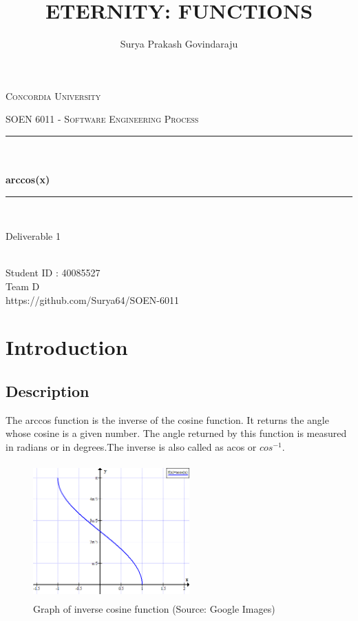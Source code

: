 \documentclass[12pt]{report}
\title{ETERNITY: FUNCTIONS}
\author{Surya Prakash Govindaraju}
\date{}
\makeatletter
\let\thetitle\@title
\let\theauthor\@author
\makeatother
\begin{document}
\begin{titlepage}
	\centering
    \vspace*{0.5 cm}
\begin{center}    \textsc{\Large Concordia University}\\[2.0 cm]	\end{center}
	\textsc{\Large  SOEN 6011 - Software Engineering Process }\\[0.5 cm]
	\rule{\linewidth}{0.2 mm} \\[0.4 cm]
	{ \huge \textbf \thetitle}\\[0.2 cm]
	{ \huge \textbf{arccos(x)}}
	\rule{\linewidth}{0.2 mm} \\[1.5 cm]

\begin{center}   {\Large Deliverable 1}\\[2.0 cm]
\end{center}	
\begin{center}   {\Large \textbf{\theauthor}} \\[0.2 cm]
                 {\large Student ID : 40085527 }\\[0.2 cm]
                 {\large Team D }\\[2.0 cm]	
                 {\large https://github.com/Surya64/SOEN-6011}
\end{center}
	
\end{titlepage}

\tableofcontents
\pagebreak

\renewcommand{\thesection}{\arabic{section}}
\section{Introduction}
\subsection{Description}
The arccos function is the inverse of the cosine function. It returns the angle whose cosine is a given number. The angle returned by this function is measured in radians or in degrees.The inverse is also called as acos or $cos^{-1}$.

\begin{figure}[h!]
\begin{center}
  \includegraphics[width=6cm, height=5.2cm]{arccos-graph.png}
  \end{center}
  \caption{Graph of inverse cosine function (Source: Google Images)}
\end{figure}
\end{document}
